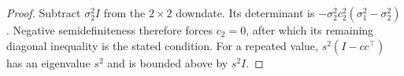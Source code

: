 \begin{proof}
Subtract $\sigma_2^2I$ from the $2\times2$ downdate. Its determinant is
$-\sigma_2^2c_2^2(\sigma_1^2-\sigma_2^2)$. Negative semidefiniteness therefore forces $c_2=0$, after which its remaining diagonal inequality is the stated condition. For a repeated value, $s^2(I-cc^\top)$ has an eigenvalue $s^2$ and is bounded above by $s^2I$.
\end{proof}
